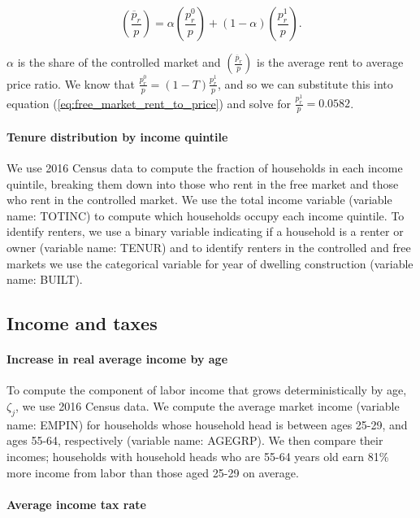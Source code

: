 \documentclass[parskip=full]{article}
\begin{document}
\begin{equation}\label{eq:free_market_rent_to_price}
    {\left(\frac{\overline{p}_{r}}{p}\right)}=\alpha \left(\frac{p^{0}_{r}}{p}\right)+(1-\alpha) \left(\frac{p^{1}_{r}}{p}\right).
\end{equation}

\noindent $\alpha$ is the share of the controlled market and ${\left(\frac{\overline{p}_{r}}{p}\right)}$ is the average rent to average price ratio. We know that $\frac{p^{0}_{r}}{p}=(1-T)\frac{p^{1}_{r}}{p}$, and so we can substitute this into equation (\ref{eq:free_market_rent_to_price}) and solve for $\frac{p^{1}_{r}}{p}=0.0582$.

\paragraph{Tenure distribution by income quintile}

We use 2016 Census data to compute the fraction of households in each income quintile, breaking them down into those who rent in the free market and those who rent in the controlled market. We use the total income variable (variable name: TOTINC) to compute which households occupy each income quintile. To identify renters, we use a  binary variable indicating if a household is a renter or owner (variable name: TENUR) and to identify renters in the controlled and free markets we use the categorical variable for year of dwelling construction (variable name: BUILT).

\subsection{Income and taxes}

\paragraph{Increase in real average income by age}

To compute the component of labor income that grows deterministically by age, $\zeta_{j}$, we use 2016 Census data. We compute the average market income (variable name: EMPIN) for households whose household head is between ages 25-29, and ages 55-64, respectively (variable name: AGEGRP). We then compare their incomes; households with household heads who are 55-64 years old earn 81\% more income from labor than those aged 25-29 on average.

\paragraph{Average income tax rate}
\end{document}
